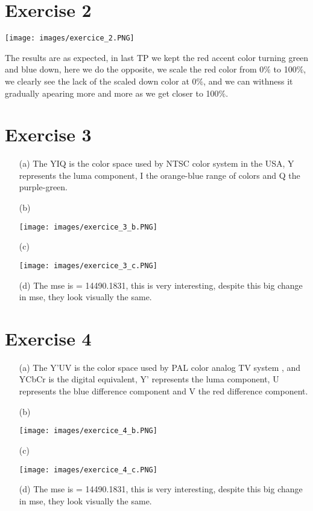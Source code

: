 \documentclass[a4paper]{article}
\begin{document}
\section*{Exercise 2}
\begin{center}
\texttt{[image: images/exercice\_2.PNG]}\\[1cm] 
\end{center}
The results are as expected, in last TP we kept the red accent color turning green and blue down, here we do the opposite, we scale the red color from 0$\%$ to 100$\%$, we clearly see the lack of the scaled down color at 0$\%$, and we can withness it gradually apearing more and more as we get closer to 100$\%$.
\section*{Exercise 3}
\begin{itemize}
\item[(a)] The YIQ is the color space used by NTSC color system in the USA, Y represents the luma component, I the orange-blue range of colors and Q the purple-green.
\item[(b)]
\begin{center}
\texttt{[image: images/exercice\_3\_b.PNG]}\\[1cm] 
\end{center}
\item[(c)]
\begin{center}
\texttt{[image: images/exercice\_3\_c.PNG]}\\[1cm] 
\end{center}
\item[(d)] The mse is = 14490.1831, this is very interesting, despite this big change in mse, they look visually the same. 
\end{itemize}
\section*{Exercise 4}
\begin{itemize}
\item[(a)] The Y'UV is the color space used by PAL color analog TV system , and YCbCr is the digital equivalent, Y' represents the luma component, U represents the blue difference component and V the red difference component.
\item[(b)]
\begin{center}
\texttt{[image: images/exercice\_4\_b.PNG]}\\[1cm] 
\end{center}
\item[(c)]
\begin{center}
\texttt{[image: images/exercice\_4\_c.PNG]}\\[1cm] 
\end{center}
\item[(d)] The mse is = 14490.1831, this is very interesting, despite this big change in mse, they look visually the same. 
\end{itemize}
\end{document}
